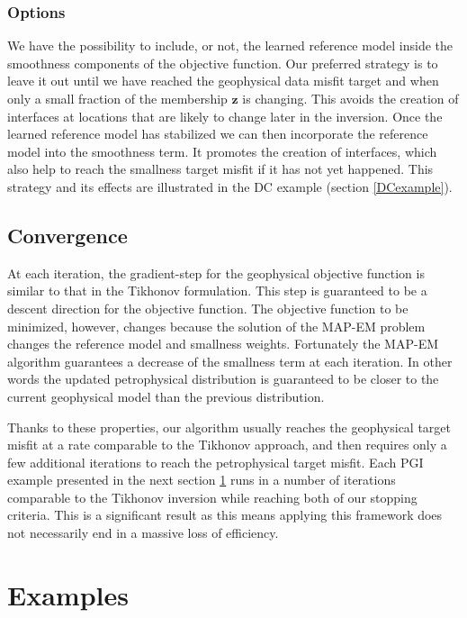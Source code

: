 \documentclass[extra]{gji} %
\begin{document}
\subsubsection{Options}

We have the possibility to include, or not, the learned reference model inside the smoothness components of the objective function. Our preferred strategy is to leave it out until we have reached the geophysical data misfit target and when only a small fraction of the membership $\mathbf{z}$ is changing. This avoids the creation of interfaces at locations that are likely to change later in the inversion. Once the learned reference model has stabilized we can then incorporate the reference model into the smoothness term. It promotes the creation of interfaces, which also help to reach the smallness target misfit if it has not yet happened. This strategy and its effects are illustrated in the DC example (section \ref{DCexample}).


\subsection{Convergence}

At each iteration, the gradient-step for the geophysical objective function is similar to that in the Tikhonov formulation. This step is guaranteed to be a descent direction for the objective function. The objective function to be minimized, however, changes because the solution of the MAP-EM problem changes the reference model and smallness weights. Fortunately the MAP-EM algorithm guarantees a decrease of the smallness term at each iteration. In other words the updated petrophysical distribution is guaranteed to be closer to the current geophysical model than the previous distribution.

Thanks to these properties, our algorithm usually reaches the geophysical target misfit at a rate comparable to the Tikhonov approach, and then requires only a few additional iterations to reach the petrophysical target misfit. Each PGI example presented in the next section \ref{section:synthetic_examples} runs in a number of iterations comparable to the Tikhonov inversion while reaching both of our stopping criteria. This is a significant result as this means applying this framework does not necessarily end in a massive loss of efficiency.

\section{Examples} \label{section:synthetic_examples}
\end{document}
